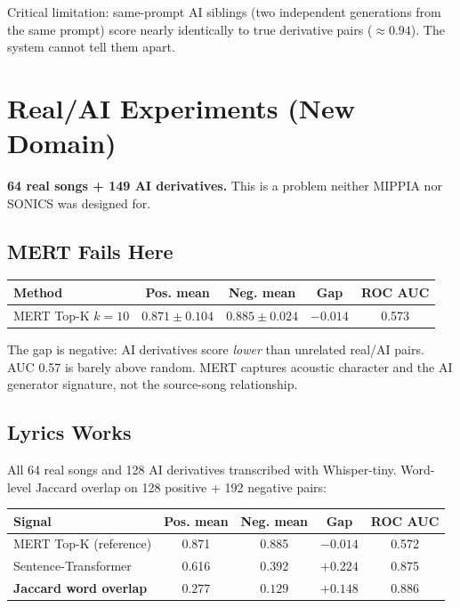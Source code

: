 \documentclass[10pt,a4paper]{article}
\begin{document}
Critical limitation: same-prompt AI siblings (two independent generations
from the same prompt) score nearly identically to true derivative pairs
($\approx 0.94$). The system cannot tell them apart.

\section{Real/AI Experiments (New Domain)}

\textbf{64 real songs + 149 AI derivatives.} This is a problem neither
MIPPIA nor SONICS was designed for.

\subsection{MERT Fails Here}

\begin{center}
\begin{tabular}{lcccc}
\toprule
Method & Pos. mean & Neg. mean & Gap & ROC AUC \\
\midrule
MERT Top-K $k=10$ & $0.871 \pm 0.104$ & $0.885 \pm 0.024$ & $-0.014$ & 0.573 \\
\bottomrule
\end{tabular}
\end{center}

The gap is negative: AI derivatives score \emph{lower} than unrelated
real/AI pairs. AUC 0.57 is barely above random. MERT captures acoustic
character and the AI generator signature, not the source-song relationship.

\subsection{Lyrics Works}

All 64 real songs and 128 AI derivatives transcribed with Whisper-tiny.
Word-level Jaccard overlap on 128 positive + 192 negative pairs:

\begin{center}
\begin{tabular}{lcccc}
\toprule
Signal & Pos. mean & Neg. mean & Gap & ROC AUC \\
\midrule
MERT Top-K (reference) & 0.871 & 0.885 & $-0.014$ & 0.572 \\
Sentence-Transformer & 0.616 & 0.392 & $+0.224$ & 0.875 \\
\textbf{Jaccard word overlap} & $\mathbf{0.277}$ & $\mathbf{0.129}$ & $\mathbf{+0.148}$ & $\mathbf{0.886}$ \\
\bottomrule
\end{tabular}
\end{center}
\end{document}
